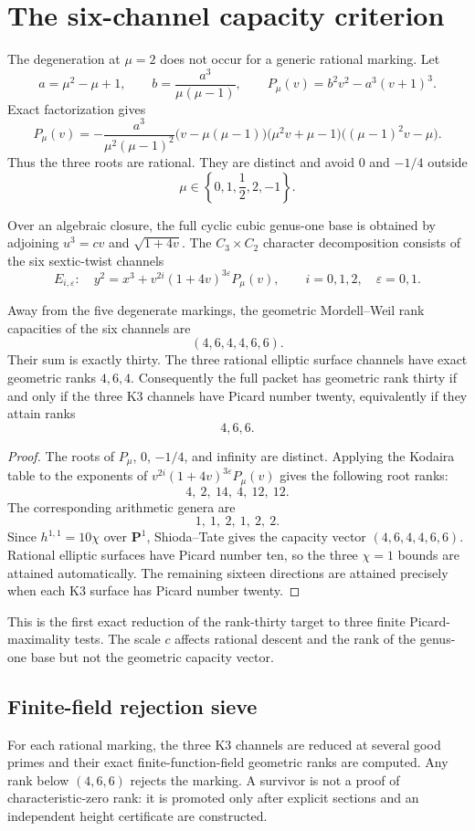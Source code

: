 \section{The six-channel capacity criterion}

The degeneration at $\mu=2$ does not occur for a generic rational marking.
Let
\[
a=\mu^2-\mu+1,
\qquad
b=\frac{a^3}{\mu(\mu-1)},
\qquad
P_\mu(v)=b^2v^2-a^3(v+1)^3.
\]
Exact factorization gives
\[
P_\mu(v)=
-\frac{a^3}{\mu^2(\mu-1)^2}
\bigl(v-\mu(\mu-1)\bigr)
\bigl(\mu^2v+\mu-1\bigr)
\bigl((\mu-1)^2v-\mu\bigr).
\]
Thus the three roots are rational. They are distinct and avoid $0$ and
$-1/4$ outside
\[
\mu\in\left\{0,1,\frac12,2,-1\right\}.
\]

Over an algebraic closure, the full cyclic cubic genus-one base is obtained
by adjoining $u^3=cv$ and $\sqrt{1+4v}$. The $C_3\times C_2$ character
decomposition consists of the six sextic-twist channels
\[
E_{i,\varepsilon}:\quad
 y^2=x^3+v^{2i}(1+4v)^{3\varepsilon}P_\mu(v),
\qquad i=0,1,2,
\quad\varepsilon=0,1.
\]

\begin{theorem}
Away from the five degenerate markings, the geometric Mordell--Weil rank
capacities of the six channels are
\[
\boxed{(4,6,4,4,6,6)}.
\]
Their sum is exactly thirty. The three rational elliptic surface channels
have exact geometric ranks $4,6,4$. Consequently the full packet has
geometric rank thirty if and only if the three K3 channels have Picard number
twenty, equivalently if they attain ranks
\[
\boxed{4,6,6}.
\]
\end{theorem}

\begin{proof}
The roots of $P_\mu$, $0$, $-1/4$, and infinity are distinct. Applying the
Kodaira table to the exponents of
$v^{2i}(1+4v)^{3\varepsilon}P_\mu(v)$ gives the following root ranks:
\[
4,\ 2,\ 14,\ 4,\ 12,\ 12.
\]
The corresponding arithmetic genera are
\[
1,\ 1,\ 2,\ 1,\ 2,\ 2.
\]
Since $h^{1,1}=10\chi$ over $\mathbf P^1$, Shioda--Tate gives the capacity
vector $(4,6,4,4,6,6)$. Rational elliptic surfaces have Picard number ten,
so the three $\chi=1$ bounds are attained automatically. The remaining
sixteen directions are attained precisely when each K3 surface has Picard
number twenty.
\end{proof}

This is the first exact reduction of the rank-thirty target to three finite
Picard-maximality tests. The scale $c$ affects rational descent and the rank
of the genus-one base but not the geometric capacity vector.

\subsection{Finite-field rejection sieve}

For each rational marking, the three K3 channels are reduced at several good
primes and their exact finite-function-field geometric ranks are computed.
Any rank below $(4,6,6)$ rejects the marking. A survivor is not a proof of
characteristic-zero rank: it is promoted only after explicit sections and an
independent height certificate are constructed.
